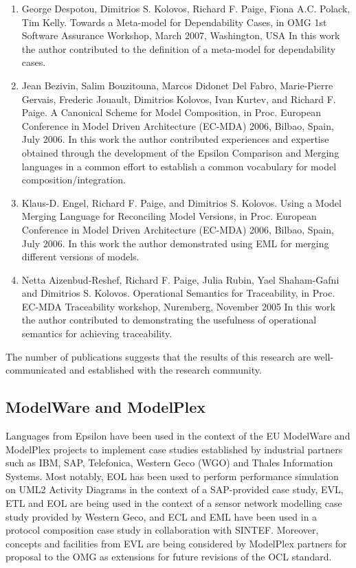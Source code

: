 \begin{enumerate}
	\item George Despotou, Dimitrios S. Kolovos, Richard F. Paige, Fiona A.C. Polack, Tim Kelly. Towards a Meta-model for Dependability Cases, in OMG 1st Software Assurance Workshop, March 2007, Washington, USA
	\subitem In this work the author contributed to the definition of a meta-model for dependability cases.
	
	\item Jean Bezivin, Salim Bouzitouna, Marcos Didonet Del Fabro, Marie-Pierre Gervais, Frederic Jouault, Dimitrios Kolovos, Ivan Kurtev, and Richard F. Paige. A Canonical Scheme for Model Composition, in Proc. European Conference in Model Driven Architecture (EC-MDA) 2006, Bilbao, Spain, July 2006.
	\subitem In this work the author contributed experiences and expertise obtained through the development of the Epsilon Comparison and Merging languages in a common effort to establish a common vocabulary for model composition/integration.
	
	\item Klaus-D. Engel, Richard F. Paige, and Dimitrios S. Kolovos. Using a Model Merging Language for Reconciling Model Versions, in Proc. European Conference in Model Driven Architecture (EC-MDA) 2006, Bilbao, Spain, July 2006.
	\subitem In this work the author demonstrated using EML for merging different versions of models.
	
	\item Netta Aizenbud-Reshef, Richard F. Paige, Julia Rubin, Yael Shaham-Gafni and Dimitrios S. Kolovos. Operational Semantics for Traceability, in Proc. EC-MDA Traceability workshop, Nuremberg, November 2005
	\subitem In this work the author contributed to demonstrating the usefulness of operational semantics for achieving traceability.
	
\end{enumerate}

The number of publications suggests that the results of this research are well-communicated and established with the research community.

\subsection{ModelWare and ModelPlex}
\label{sec:EUProjects}

Languages from Epsilon have been used in the context of the EU ModelWare \cite{ModelWare} and ModelPlex \cite{ModelPlex} projects to implement case studies established by industrial partners such as IBM, SAP, Telefonica, Western Geco (WGO) and Thales Information Systems. Most notably, EOL has been used to perform performance simulation on UML2 Activity Diagrams in the context of a SAP-provided case study, EVL, ETL and EOL are being used in the context of a sensor network modelling case study provided by Western Geco, and ECL and EML have been used in a protocol composition case study in collaboration with SINTEF. Moreover, concepts and facilities from EVL are being considered by ModelPlex partners for proposal to the OMG as extensions for future revisions of the OCL standard.

